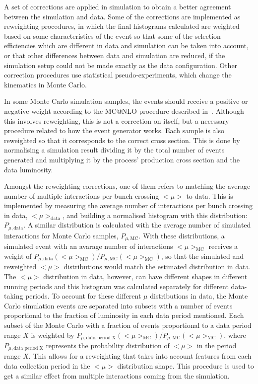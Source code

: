 A set of corrections are applied in simulation to obtain a better agreement between the simulation and data.
Some of the corrections are implemented as reweighting procedures, in which the final histograms calculated are weighted based on some characteristics of the event
so that some of the selection efficiencies which are different in data and simulation can be taken into account, or that other differences between data and simulation
are reduced, if the simulation setup could not be made exactly as the data configuration.
Other correction procedures use statistical pseudo-experiments, which change the kinematics in Monte Carlo.

In some Monte Carlo simulation samples, the events should receive a positive or negative weight according to the MC@NLO procedure described in~\cite{mcatnlo}. Although this
involves reweighting, this is not a correction on itself, but a necessary procedure related to how the event generator works.
Each sample is also reweighted so that it corresponds to the correct cross section. This is done by normalising a simulation result dividing it by
the total number of events generated and multiplying it by the process' production cross section and the data luminosity.

Amongst the reweighting corrections, one of them refers to matching the average number of multiple interactions per bunch crossing $<\mu>$ to data.
This is implemented by measuring the average number of interactions per bunch crossing in data, $<\mu>_{\textrm{data}}$, and building a normalised histogram
with this distribution: $P_{\mu,\textrm{data}}$. A similar distribution is calculated with the average number of simulated interactions for Monte Carlo samples,
$P_{\mu,\textrm{MC}}$. With these distributions, a simulated event with an avarage number of interactions $<\mu>_{\textrm{MC}}$ receives a weight of
$P_{\mu,\textrm{data}}(<\mu>_{\textrm{MC}})/P_{\mu,\textrm{MC}}(<\mu>_{\textrm{MC}})$, so that the simulated and reweighted $<\mu>$ distributions would match the estimated
distribution in data. The $<\mu>$ distribution in data, however, can have different shapes in different running periods and this histogram was calculated separately for different data-taking periods.
To account for these different $\mu$ distributions in data, the Monte Carlo simulation events
are separated into subsets with a number of events proportional to the fraction of luminosity in each data period mentioned.
Each subset of the Monte Carlo with a fraction of events proportional to a data period range $X$ is
weighted by $P_{\mu,\textrm{data period X}}(<\mu>_{\textrm{MC}})/P_{\mu,\textrm{MC}}(<\mu>_{\textrm{MC}})$, where $P_{\mu,\textrm{data period X}}$
represents the probability distribution of $<\mu>$ in the period range $X$.
This allows for a reweighting that takes into account features 
from each data collection period in the $<\mu>$ distribution shape. This procedure is used to
get a similar effect from multiple interactions coming from the simulation.

